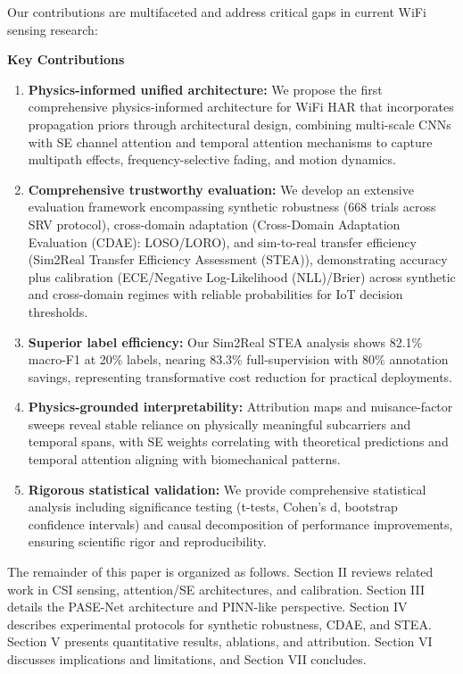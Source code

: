 \documentclass[journal]{IEEEtran}
\begin{document}
Our contributions are multifaceted and address critical gaps in current WiFi sensing research:

\textbf{Key Contributions}
\begin{enumerate}
  \item \textbf{Physics-informed unified architecture:} We propose the first comprehensive physics-informed architecture for WiFi HAR that incorporates propagation priors through architectural design, combining multi-scale CNNs with SE channel attention and temporal attention mechanisms to capture multipath effects, frequency-selective fading, and motion dynamics.
  \item \textbf{Comprehensive trustworthy evaluation:} We develop an extensive evaluation framework encompassing synthetic robustness (668 trials across SRV protocol), cross-domain adaptation (Cross-Domain Adaptation Evaluation (CDAE): LOSO/LORO), and sim-to-real transfer efficiency (Sim2Real Transfer Efficiency Assessment (STEA)), demonstrating accuracy plus calibration (ECE/Negative Log-Likelihood (NLL)/Brier) across synthetic and cross-domain regimes with reliable probabilities for IoT decision thresholds.
  \item \textbf{Superior label efficiency:} Our Sim2Real STEA analysis shows 82.1\% macro-F1 at 20\% labels, nearing 83.3\% full-supervision with 80\% annotation savings, representing transformative cost reduction for practical deployments.
  \item \textbf{Physics-grounded interpretability:} Attribution maps and nuisance-factor sweeps reveal stable reliance on physically meaningful subcarriers and temporal spans, with SE weights correlating with theoretical predictions and temporal attention aligning with biomechanical patterns.
  \item \textbf{Rigorous statistical validation:} We provide comprehensive statistical analysis including significance testing (t-tests, Cohen's d, bootstrap confidence intervals) and causal decomposition of performance improvements, ensuring scientific rigor and reproducibility.
\end{enumerate}

The remainder of this paper is organized as follows. Section II reviews related work in CSI sensing, attention/SE architectures, and calibration. Section III details the PASE-Net architecture and PINN-like perspective. Section IV describes experimental protocols for synthetic robustness, CDAE, and STEA. Section V presents quantitative results, ablations, and attribution. Section VI discusses implications and limitations, and Section VII concludes.
\end{document}
